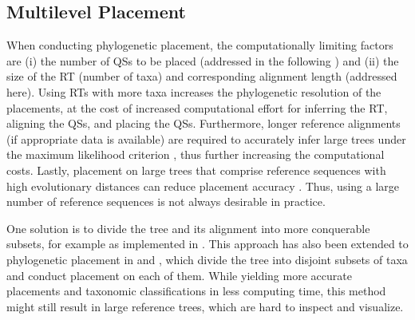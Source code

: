 
\subsection{Multilevel Placement}
\label{ch:AutomaticTrees:sec:Methods:sub:MultilevelPlacement}


When conducting phylogenetic placement, the computationally limiting factors are
(i) the number of \acp{QS} to be placed (addressed in the following )
and (ii) the size of the \ac{RT} (number of taxa) and corresponding alignment length (addressed here).
Using \acp{RT} with more taxa increases the phylogenetic resolution of the placements,
at the cost of increased computational effort for inferring the \ac{RT}, aligning the \acp{QS}, and placing the \acp{QS}.
Furthermore, longer reference alignments (if appropriate data is available)
are required to accurately infer large trees under the maximum likelihood criterion \citep{Yang1994},
thus further increasing the computational costs.
Lastly, placement on large trees that comprise reference sequences with high evolutionary distances
can reduce placement accuracy \citep{Mirarab2012}.
Thus, using a large number of reference sequences is not always desirable in practice.

One solution is to divide the tree and its alignment into more conquerable subsets, %
for example as implemented in  \citep{Liu2009,Liu2012}.
This approach has also been extended to phylogenetic placement
in  \citep{Mirarab2012} and  \citep{Nguyen2014},
which divide the tree into disjoint subsets of taxa and conduct placement on each of them.
While yielding more accurate placements and taxonomic classifications in less computing time,
this method might still result in large reference trees, which are hard to inspect and visualize.


